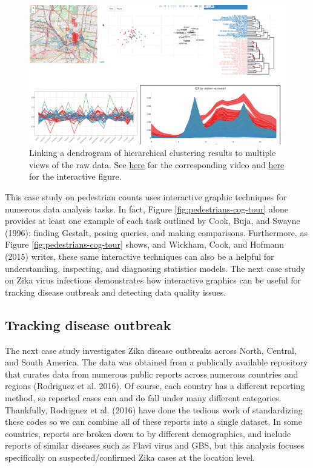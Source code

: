 \documentclass[12pt,]{article}
\theoremstyle{definition}
\theoremstyle{definition}
\theoremstyle{remark}
\begin{document}
\begin{figure}
\centering
\includegraphics{images/pedestrians-dendro.pdf}
\caption{\label{fig:pedestrians-dendro}Linking a dendrogram of hierarchical
clustering results to multiple views of the raw data. See
\href{https://vimeo.com/189670650}{here} for the corresponding video and
\href{http://cpsievert.github.io/pedestrians/tour-dendro/}{here} for the
interactive figure.}
\end{figure}

This case study on pedestrian counts uses interactive graphic techniques
for numerous data analysis tasks. In fact, Figure
\ref{fig:pedestrians-cog-tour} alone provides at least one example of
each task outlined by Cook, Buja, and Swayne (1996): finding Gestalt,
posing queries, and making comparisons. Furthermore, as Figure
\ref{fig:pedestrians-cog-tour} shows, and Wickham, Cook, and Hofmann
(2015) writes, these same interactive techniques can also be a helpful
for understanding, inspecting, and diagnosing statistics models. The
next case study on Zika virus infections demonstrates how interactive
graphics can be useful for tracking disease outbreak and detecting data
quality issues.

\hypertarget{tracking-disease-outbreak}{\subsection{Tracking disease
outbreak}\label{tracking-disease-outbreak}}

The next case study investigates Zika disease outbreaks across North,
Central, and South America. The data was obtained from a publically
available repository that curates data from numerous public reports
across numerous countries and regions (Rodriguez et al. 2016). Of
course, each country has a different reporting method, so reported cases
can and do fall under many different categories. Thankfully, Rodriguez
et al. (2016) have done the tedious work of standardizing these codes so
we can combine all of these reports into a single dataset. In some
countries, reports are broken down to by different demographics, and
include reports of similar diseases such as Flavi virus and GBS, but
this analysis focuses specifically on suspected/confirmed Zika cases at
the location level.
\end{document}
